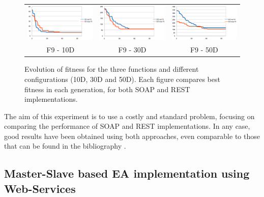 \documentclass[final,1p,times]{elsarticle}
\begin{document}
\begin{figure}[!ht]
\begin{center}
\begin{tabular}{ccc}
 \includegraphics[width=5cm]{f9d10.eps}  & \includegraphics[width=5cm]{f9d30.eps}  &  \includegraphics[width=5cm]{f9d50.eps}  \\
 
 F9 - 10D & F9 - 30D & F9 - 50D \\
 
\end{tabular}
\caption{Evolution of fitness for the three functions and different configurations (10D, 30D and 50D). Each figure compares best fitness in each generation, for both SOAP and REST implementations. }
\label{figure:expREVIEW}
\end{center}
\end{figure}



The aim of this experiment is to use a costly and standard problem, focusing on comparing the performance of SOAP and REST implementations.
In any case, good results have been obtained using both approaches, even comparable to those that can be found in the bibliography \cite{Song2007,Fan2010,Qin2009}.




\subsection{Master-Slave based EA implementation using Web-Services}
\label{subsect:experiment3}
\end{document}
